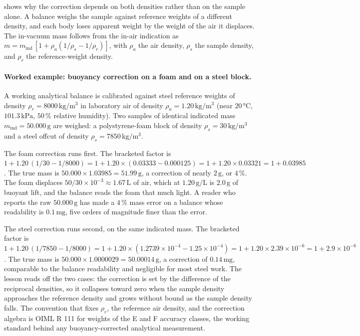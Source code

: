 

 shows why the correction
depends on both densities rather than on the sample alone. A balance
weighs the sample against reference weights of a different density,
and each body loses apparent weight by the weight of the air it
displaces. The in-vacuum mass follows from the in-air indication as
$m = m_{\mathrm{ind}}\,[1 + \rho_{a}(1/\rho_{s} - 1/\rho_{r})]$, with
$\rho_{a}$ the air density, $\rho_{s}$ the sample density, and
$\rho_{r}$ the reference-weight density.

\paragraph{Worked example: buoyancy correction on a foam and on a
steel block.}
A working analytical balance is calibrated against steel reference
weights of density $\rho_{r} = 8000 \,\si{\kilogram\per\meter\cubed}$
in laboratory air of density $\rho_{a} = 1.20 \,\si{\kilogram\per
\meter\cubed}$ (near $20 \,\si{\degreeCelsius}$, $101.3 \,\text{kPa}$,
$50\,\%$ relative humidity). Two samples of identical indicated mass
$m_{\mathrm{ind}} = 50.000 \,\si{\gram}$ are weighed: a
polystyrene-foam block of density $\rho_{s} = 30 \,\si{\kilogram
\per\meter\cubed}$ and a steel offcut of density $\rho_{s} = 7850 \,
\si{\kilogram\per\meter\cubed}$.

The foam correction runs first. The bracketed factor is
$1 + 1.20\,(1/30 - 1/8000) = 1 + 1.20 \times (0.03333 - 0.000125)
= 1 + 1.20 \times 0.03321 = 1 + 0.03985$. The true mass is
$50.000 \times 1.03985 = 51.99 \,\si{\gram}$, a correction of nearly
$2 \,\si{\gram}$, or $4\,\%$. The foam displaces
$50 / 30 \times 10^{-3} \approx 1.67 \,\si{\liter}$ of air, which at
$1.20 \,\si{\gram\per\liter}$ is $2.0 \,\si{\gram}$ of buoyant lift,
and the balance reads the foam that much light. A reader who reports
the raw $50.000 \,\si{\gram}$ has made a $4\,\%$ mass error on a
balance whose readability is $0.1 \,\si{\milli\gram}$, five orders
of magnitude finer than the error.

The steel correction runs second, on the same indicated mass. The
bracketed factor is $1 + 1.20\,(1/7850 - 1/8000) = 1 + 1.20 \times
(1.2739 \times 10^{-4} - 1.25 \times 10^{-4}) = 1 + 1.20 \times
2.39 \times 10^{-6} = 1 + 2.9 \times 10^{-6}$. The true mass is
$50.000 \times 1.0000029 = 50.00014 \,\si{\gram}$, a correction of
$0.14 \,\si{\milli\gram}$, comparable to the balance readability and
negligible for most steel work. The lesson reads off the two cases:
the correction is set by the difference of the reciprocal densities,
so it collapses toward zero when the sample density approaches the
reference density and grows without bound as the sample density
falls. The convention that fixes $\rho_{r}$, the reference air
density, and the correction algebra is OIML R 111 for weights of the
E and F accuracy classes, the working standard behind any
buoyancy-corrected analytical measurement.

